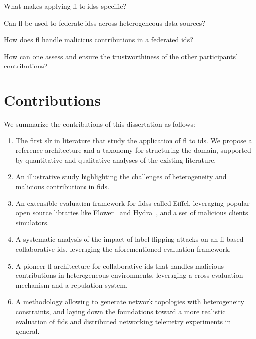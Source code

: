 \begin{questions}
  \item What makes applying \gls{fl} to \glspl{ids} specific? \label{rq:intro.fids}
  \item Can \gls{fl} be used to federate \glspl{ids} across heterogeneous data sources? \label{rq:intro.heterogeneity}
  \item How does \gls{fl} handle malicious contributions in a federated \gls{ids}? \label{rq:intro.malicious}
  \item How can one assess and ensure the trustworthiness of the other participants' contributions? \label{rq:intro.trust}
\end{questions}


\section{Contributions\label{sec:intro.contributions}}

We summarize the contributions of this dissertation as follows:

\begin{enumerate}
  \item The first \gls{slr} in literature that study the application of \gls{fl} to \gls{ids}. We propose a reference architecture and a taxonomy for structuring the domain, supported by quantitative and qualitative analyses of the existing literature.
  \item An illustrative study highlighting the challenges of heterogeneity and malicious contributions in \gls{fids}.
  \item An extensible evaluation framework for \glspl{fids} called Eiffel, leveraging popular open source libraries like Flower~\cite{beutel_Flowerfriendlyfederated_2020} and Hydra~\cite{Hydra}, and a set of malicious clients simulators. 
  \item A systematic analysis of the impact of label-flipping attacks on an \gls{fl}-based collaborative \gls{ids}, leveraging the aforementioned evaluation framework.
  \item A pioneer \gls{fl} architecture for collaborative \gls{ids} that handles malicious contributions in heterogeneous environments, leveraging a cross-evaluation mechanism and a reputation system.
  \item A methodology allowing to generate network topologies with heterogeneity constraints, and laying down the foundations toward a more realistic evaluation of \gls{fids} and distributed networking telemetry experiments in general.
\end{enumerate}


